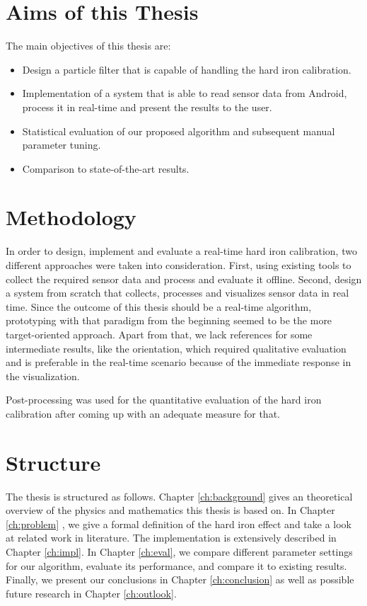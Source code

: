 \section{Aims of this Thesis}

The main objectives of this thesis are:

\begin{itemize}
  \item Design a particle filter that is capable of handling the hard iron calibration.
  \item Implementation of a system that is able to read sensor data from Android, process it in real-time and present the results to the user.
  \item Statistical evaluation of our proposed algorithm and subsequent manual parameter tuning.
  \item Comparison to state-of-the-art results.
\end{itemize}

\section{Methodology}

In order to design, implement and evaluate a real-time hard iron calibration, two different approaches were taken into consideration. First, using existing tools to collect the required sensor data and process and evaluate it offline. Second, design a system from scratch that collects, processes and visualizes sensor data in real time. Since the outcome of this thesis should be a real-time algorithm, prototyping with that paradigm from the beginning seemed to be the more target-oriented approach. Apart from that, we lack references for some intermediate results, like the orientation, which required qualitative evaluation and is preferable in the real-time scenario because of the immediate response in the visualization.

Post-processing was used for the quantitative evaluation of the hard iron calibration after coming up with an adequate measure for that.

\section{Structure}

The thesis is structured as follows. Chapter \ref{ch:background} gives an theoretical overview of the physics and mathematics this thesis is based on. In Chapter \ref{ch:problem} , we give a formal definition of the hard iron effect and take a look at related work in literature. The implementation is extensively described in Chapter \ref{ch:impl}. In Chapter \ref{ch:eval}, we compare different parameter settings for our algorithm, evaluate its performance, and compare it to existing results. Finally, we present our conclusions in Chapter \ref{ch:conclusion} as well as possible future research in Chapter \ref{ch:outlook}.

